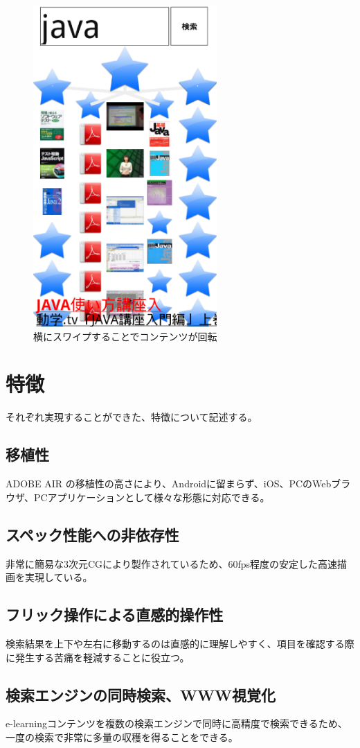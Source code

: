 \begin{figure}[htbp]
\begin{center}
\includegraphics[width=7cm]{le06.eps}
\caption{横にスワイプすることでコンテンツが回転}
\label{le06}
\end{center}
\end{figure}

\section{特徴}
それぞれ実現することができた、特徴について記述する。

\subsection{移植性}
ADOBE AIR の移植性の高さにより、Androidに留まらず、iOS、PCのWebブラウザ、PCアプリケーションとして様々な形態に対応できる。

\subsection{スペック性能への非依存性}
非常に簡易な3次元CGにより製作されているため、60fps程度の安定した高速描画を実現している。

\subsection{フリック操作による直感的操作性}
検索結果を上下や左右に移動するのは直感的に理解しやすく、項目を確認する際に発生する苦痛を軽減することに役立つ。

\subsection{検索エンジンの同時検索、WWW視覚化}
e-learningコンテンツを複数の検索エンジンで同時に高精度で検索できるため、一度の検索で非常に多量の収穫を得ることをできる。